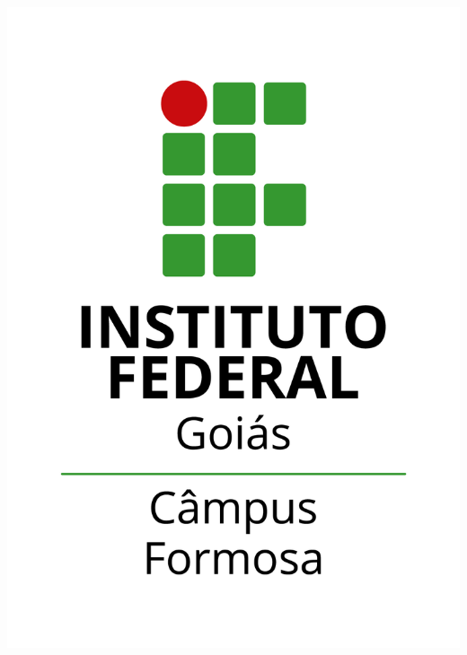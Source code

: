 \documentclass[
	10pt,				%
	openright,			%
	twoside,			%
	a4paper,			%
	english,			%
	french,				%
	brazil,				%
	sumario=tradicional
]{abntex2}
\begin{document}
\frenchspacing

\frontmatter

\begin{titlingpage}
\phantom{xxx}
\vspace{0.5cm}
\huge
\centering 
\includegraphics[scale=0.1]{fig/ifgvertical.png}\\[1cm]
\vspace{2.5cm}
\huge 
\imprimirautor\\
\vspace{2.5cm}
\huge\imprimirtitulo\\[1cm]
\vfill
\Large
\imprimirinstituicao
\end{titlingpage}
\end{document}
